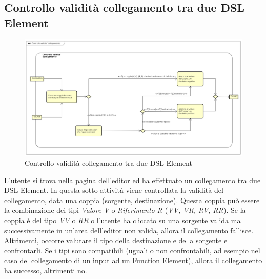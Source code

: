     \subsection{Controllo validità collegamento tra due DSL Element}
    \begin{figure}[H]
      \centering
      \includegraphics[width=1.1\textwidth]{res/img/controlloCollegamento.png}
      \caption{Controllo validità collegamento tra due DSL Element}
      \label{fig:diagram_model}
    \end{figure}
L'utente si trova nella pagina dell'editor ed ha effettuato un collegamento tra due DSL Element. In questa sotto-attività viene controllata la validità del collegamento, data una coppia (sorgente, destinazione). Questa coppia può essere la combinazione dei tipi \textit{Valore V} o \textit{Riferimento R} (\textit{VV, VR, RV, RR}). Se la coppia è del tipo \textit{VV} o \textit{RR} o l'utente ha cliccato su una sorgente valida ma successivamente in un'area dell'editor non valida, allora il collegamento fallisce. Altrimenti, occorre valutare il tipo della destinazione e della sorgente e confrontarli. Se i tipi sono compatibili (uguali o non confrontabili, ad esempio nel caso del collegamento di un input ad un Function Element), allora il collegamento ha successo, altrimenti no. 
